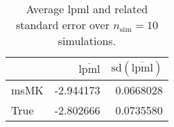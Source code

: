 \begin{table}[H]

\caption{Average lpml and related standard error over $n_{\text{sim}} = 10$ simulations.}
\centering
\begin{tabular}[t]{lrr}
\toprule
  & $\overbar{\text{lpml}}$ & $\text{sd}(\overbar{\text{lpml}})$\\
\midrule
msMK & -2.944173 & 0.0668028\\
True & -2.802666 & 0.0735580\\
\bottomrule
\end{tabular}
\end{table}